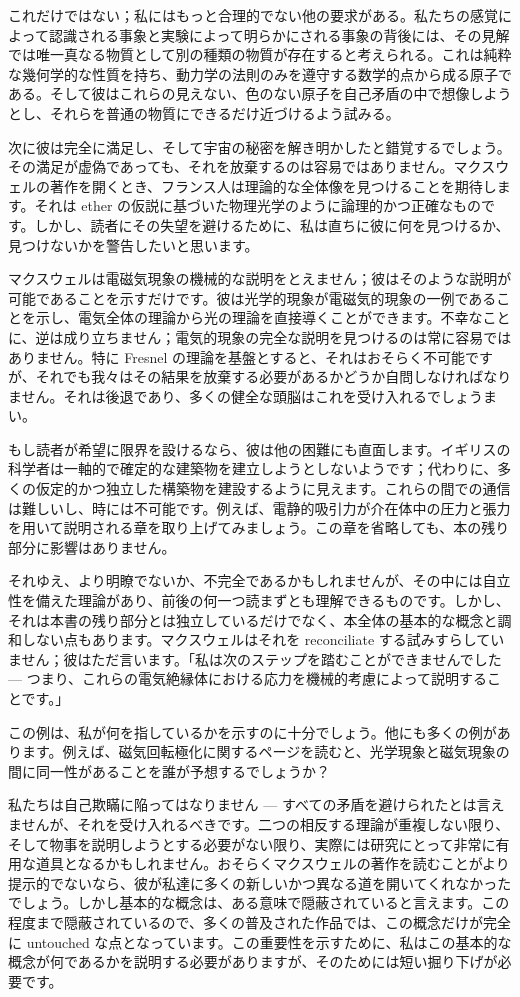 \documentclass[a4paper,11pt,openany]{ltjsbook}
\begin{document}
これだけではない；私にはもっと合理的でない他の要求がある。私たちの感覚によって認識される事象と実験によって明らかにされる事象の背後には、その見解では唯一真なる物質として別の種類の物質が存在すると考えられる。これは純粋な幾何学的な性質を持ち、動力学の法則のみを遵守する数学的点から成る原子である。そして彼はこれらの見えない、色のない原子を自己矛盾の中で想像しようとし、それらを普通の物質にできるだけ近づけるよう試みる。

次に彼は完全に満足し、そして宇宙の秘密を解き明かしたと錯覚するでしょう。その満足が虚偽であっても、それを放棄するのは容易ではありません。マクスウェルの著作を開くとき、フランス人は理論的な全体像を見つけることを期待します。それは ether の仮説に基づいた物理光学のように論理的かつ正確なものです。しかし、読者にその失望を避けるために、私は直ちに彼に何を見つけるか、見つけないかを警告したいと思います。


マクスウェルは電磁気現象の機械的な説明をとえません；彼はそのような説明が可能であることを示すだけです。彼は光学的現象が電磁気的現象の一例であることを示し、電気全体の理論から光の理論を直接導くことができます。不幸なことに、逆は成り立ちません；電気的現象の完全な説明を見つけるのは常に容易ではありません。特に Fresnel の理論を基盤とすると、それはおそらく不可能ですが、それでも我々はその結果を放棄する必要があるかどうか自問しなければなりません。それは後退であり、多くの健全な頭脳はこれを受け入れるでしょうまい。

もし読者が希望に限界を設けるなら、彼は他の困難にも直面します。イギリスの科学者は一軸的で確定的な建築物を建立しようとしないようです；代わりに、多くの仮定的かつ独立した構築物を建設するように見えます。これらの間での通信は難しいし、時には不可能です。例えば、電静的吸引力が介在体中の圧力と張力を用いて説明される章を取り上げてみましょう。この章を省略しても、本の残り部分に影響はありません。


それゆえ、より明瞭でないか、不完全であるかもしれませんが、その中には自立性を備えた理論があり、前後の何一つ読まずとも理解できるものです。しかし、それは本書の残り部分とは独立しているだけでなく、本全体の基本的な概念と調和しない点もあります。マクスウェルはそれを reconciliate する試みすらしていません；彼はただ言います。「私は次のステップを踏むことができませんでした — つまり、これらの電気絶縁体における応力を機械的考慮によって説明することです。」

この例は、私が何を指しているかを示すのに十分でしょう。他にも多くの例があります。例えば、磁気回転極化に関するページを読むと、光学現象と磁気現象の間に同一性があることを誰が予想するでしょうか？

私たちは自己欺瞞に陥ってはなりません — すべての矛盾を避けられたとは言えませんが、それを受け入れるべきです。二つの相反する理論が重複しない限り、そして物事を説明しようとする必要がない限り、実際には研究にとって非常に有用な道具となるかもしれません。おそらくマクスウェルの著作を読むことがより提示的でないなら、彼が私達に多くの新しいかつ異なる道を開いてくれなかったでしょう。しかし基本的な概念は、ある意味で隠蔽されていると言えます。この程度まで隠蔽されているので、多くの普及された作品では、この概念だけが完全に untouched な点となっています。この重要性を示すために、私はこの基本的な概念が何であるかを説明する必要がありますが、そのためには短い掘り下げが必要です。
\end{document}

